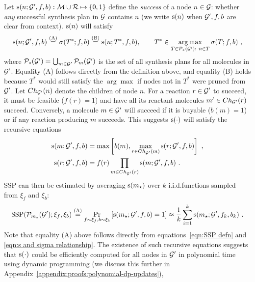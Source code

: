 Let 
${\textnormal{s}}(n; {\mathcal{G}}',f,b):{\mathcal{M}}\cup{\mathcal{R}}\mapsto\{0,1\}$
define the \emph{success} of a node $n\in{\mathcal{G}}$:
whether \emph{any} successful synthesis plan in ${\mathcal{G}}$ contains $n$
(we write ${\textnormal{s}}(n)$ when ${\mathcal{G}}',f,b$ are clear from context).
${\textnormal{s}}(n)$ will satisfy
\begin{equation}\label{eqn:s and sigma relationship}
    {\textnormal{s}}(n;{\mathcal{G}}',f,b)
    \stackrel{\text{(A)}}{=}
    \sigma(T^*;f,b)
    \stackrel{\text{(B)}}{=}
    {\textnormal{s}}(n;T^*,f,b)
    ,\qquad
    T^*\in\operatorname*{arg\,max}_{
        T\in\mathcal{P}_{*}({\mathcal{G}}'):\ n\in T
    }
        \sigma(T;f,b)\ ,
\end{equation}
where $\mathcal{P}_{*}({\mathcal{G}}')=\bigcup_{m\in{\mathcal{G}}'}\mathcal{P}_m({\mathcal{G}}')$ is the set of all synthesis plans for all molecules in ${\mathcal{G}}'$.
Equality (A) follows directly from the definition above,
and equality (B) holds because $T^*$
would still satisfy the $\arg\max$ if nodes not in $T^*$ were pruned from ${\mathcal{G}}'$.
Let $Ch_{{\mathcal{G}}'}(n)$ denote the children of node $n$.
For a reaction $r\in{\mathcal{G}}'$ to succeed,
it must be feasible ($f(r)=1$) and have all its reactant molecules
$m'\in Ch_{{\mathcal{G}}'}(r)$ succeed.
Conversely, a molecule $m\in{\mathcal{G}}'$ will succeed
if it is buyable ($b(m)=1$) or if any reaction producing $m$ succeeds.
This suggests ${\textnormal{s}}(\cdot)$ will satisfy the recursive equations
\begin{align}
    {\textnormal{s}}(m;{\mathcal{G}}',f,b) &= 
        \max\left[
            b(m),
            \max_{r\in Ch_{{\mathcal{G}}'}(m)}{\textnormal{s}}(r;{\mathcal{G}}',f,b)
        \right]\ , \label{eqn:molecule success}\\
    {\textnormal{s}}(r;{\mathcal{G}}',f,b) &=
        f(r) \prod_{m\in Ch_{{\mathcal{G}}'}(r)} {\textnormal{s}}(m;{\mathcal{G}}',f,b)
    \ . \label{eqn:reaction success}
\end{align}
SSP can then be estimated by averaging ${\textnormal{s}}(m_\star)$
over $k$ i.i.d.\@ functions sampled from $\xi_f$ and $\xi_b$:
\begin{equation}\label{eqn:estimating SSP from s}
    \mathrm{SSP}(\mathcal{P}_{m_\star}({\mathcal{G}}') ; \xi_f, \xi_b)
    \stackrel{\text{(A)}}{=}
    \Pr_{f\sim\xi_f, b\sim\xi_b}\left[
        {\textnormal{s}}(m_\star;{\mathcal{G}}',f,b) = 1
    \right]
    \approx
    \frac{1}{k}\sum_{i=1}^k
        {\textnormal{s}}(m_\star;{\mathcal{G}}',f_k,b_k)
    \ .
\end{equation}
Note that equality (A) above follows directly from
equations~\ref{eqn:SSP defn} and \ref{eqn:s and sigma relationship}.
The existence of such recursive equations suggests that ${\textnormal{s}}(\cdot)$
could be efficiently computed for all nodes in ${\mathcal{G}}'$ in polynomial time
using dynamic programming
(we discuss this further in Appendix~\ref{appendix:proofs:polynomial-dp-updates}),
